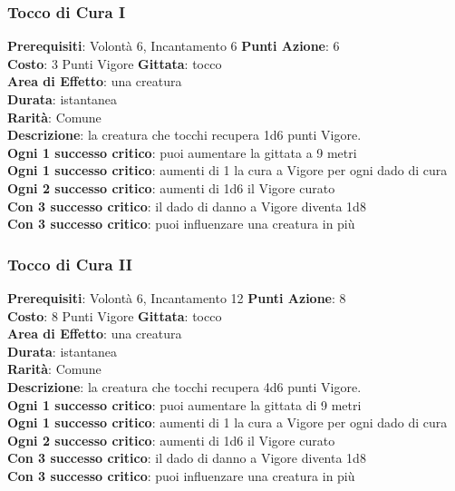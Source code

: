 \documentclass[12pt,a4paper,twoside,openany]{book}
\begin{document}
\begin{multicols}{2}
\subsubsection*{Tocco di Cura I}
\textbf{Prerequisiti}: Volontà 6, Incantamento 6
\textbf{Punti Azione}: 6\\
\textbf{Costo}: 3 Punti Vigore
\textbf{Gittata}: tocco \\
\textbf{Area di Effetto}: una creatura\\
\textbf{Durata}: istantanea\\
\textbf{Rarità}: Comune\\
\textbf{Descrizione}: la creatura che tocchi recupera 1d6 punti Vigore.\\
\textbf{Ogni 1 successo critico}: puoi aumentare la gittata a 9 metri\\
\textbf{Ogni 1 successo critico}: aumenti di 1 la cura a Vigore per ogni dado di cura
\textbf{Ogni 2 successo critico}: aumenti di 1d6 il Vigore curato\\
\textbf{Con 3 successo critico}: il dado di danno a Vigore diventa 1d8\\
\textbf{Con 3 successo critico}: puoi influenzare una creatura in più\\


\subsubsection*{Tocco di Cura II}
\textbf{Prerequisiti}: Volontà 6, Incantamento 12
\textbf{Punti Azione}: 8\\
\textbf{Costo}: 8 Punti Vigore
\textbf{Gittata}: tocco \\
\textbf{Area di Effetto}: una creatura\\
\textbf{Durata}: istantanea\\
\textbf{Rarità}: Comune\\
\textbf{Descrizione}: la creatura che tocchi recupera 4d6 punti Vigore.\\
\textbf{Ogni 1 successo critico}: puoi aumentare la gittata di 9 metri\\
\textbf{Ogni 1 successo critico}: aumenti di 1 la cura a Vigore per ogni dado di cura
\textbf{Ogni 2 successo critico}: aumenti di 1d6 il Vigore curato\\
\textbf{Con 3 successo critico}: il dado di danno a Vigore diventa 1d8\\
\textbf{Con 3 successo critico}: puoi influenzare una creatura in più\\



\end{multicols}
\end{document}
